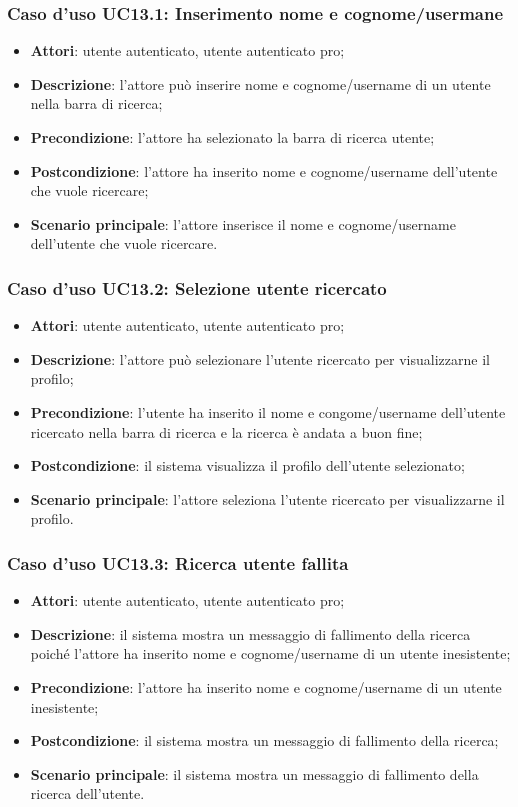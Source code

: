 \subsubsection{Caso d'uso UC13.1: Inserimento nome e cognome/usermane}

\begin{itemize}
	\item \textbf{Attori}: utente autenticato, utente autenticato pro;
	\item \textbf{Descrizione}: l'attore può inserire nome e cognome/username di un utente nella barra di ricerca;
	\item \textbf{Precondizione}: l'attore ha selezionato la barra di ricerca utente;
	\item \textbf{Postcondizione}: l'attore ha inserito nome e cognome/username dell'utente che vuole ricercare;
	\item \textbf{Scenario principale}: l'attore inserisce il nome e cognome/username dell'utente che vuole ricercare.
\end{itemize}

\subsubsection{Caso d'uso UC13.2: Selezione utente ricercato}

\begin{itemize}
	\item \textbf{Attori}: utente autenticato, utente autenticato pro;
	\item \textbf{Descrizione}: l'attore può selezionare l'utente ricercato per visualizzarne il profilo;
	\item \textbf{Precondizione}: l'utente ha inserito il nome e congome/username dell'utente ricercato nella barra di ricerca e la ricerca è andata a buon fine;
	\item \textbf{Postcondizione}: il sistema visualizza il profilo dell'utente selezionato;
	\item \textbf{Scenario principale}: l'attore seleziona l'utente ricercato per visualizzarne il profilo.
\end{itemize}

\subsubsection{Caso d'uso UC13.3: Ricerca utente fallita}

\begin{itemize}
	\item \textbf{Attori}: utente autenticato, utente autenticato pro;
	\item \textbf{Descrizione}: il sistema mostra un messaggio di fallimento della ricerca poiché l'attore ha inserito nome e cognome/username di un utente inesistente;
	\item \textbf{Precondizione}: l'attore ha inserito nome e cognome/username di un utente inesistente;
	\item \textbf{Postcondizione}: il sistema mostra un messaggio di fallimento della ricerca;
	\item \textbf{Scenario principale}: il sistema mostra un messaggio di fallimento della ricerca dell'utente.
\end{itemize}